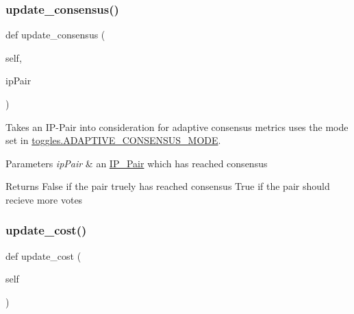 \mbox{\label{classdynamicfilterapp_1_1models_1_1_predicate_a34ad16d30b9a279473a83b2c43dedfa1}} 
\subsubsection{\texorpdfstring{update\+\_\+consensus()}{update\_consensus()}}
{\footnotesize\ttfamily def update\+\_\+consensus (\begin{DoxyParamCaption}\item[{}]{self,  }\item[{}]{ip\+Pair }\end{DoxyParamCaption})}



Takes an I\+P-\/\+Pair into consideration for adaptive consensus metrics uses the mode set in \mbox{\hyperlink{namespacedynamicfilterapp_1_1toggles_a394fa3f8531c2ecc987f982367a4af2d}{toggles.\+A\+D\+A\+P\+T\+I\+V\+E\+\_\+\+C\+O\+N\+S\+E\+N\+S\+U\+S\+\_\+\+M\+O\+DE}}. 


\begin{DoxyParams}{Parameters}
{\em ip\+Pair} & an \mbox{\hyperlink{classdynamicfilterapp_1_1models_1_1_i_p___pair}{I\+P\+\_\+\+Pair}} which has reached consensus \\
\hline
\end{DoxyParams}
\begin{DoxyReturn}{Returns}
False if the pair truely has reached consensus True if the pair should recieve more votes 
\end{DoxyReturn}
\mbox{\label{classdynamicfilterapp_1_1models_1_1_predicate_a848ee4c7a2121d6e272137b6d3c8b843}} 
\subsubsection{\texorpdfstring{update\+\_\+cost()}{update\_cost()}}
{\footnotesize\ttfamily def update\+\_\+cost (\begin{DoxyParamCaption}\item[{}]{self }\end{DoxyParamCaption})}

